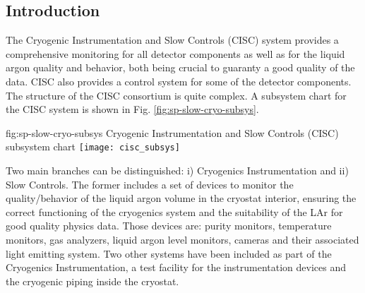 \subsection{Introduction}
\label{sec:fdsp-slow-cryo-intro}



The Cryogenic Instrumentation and Slow Controls (CISC) system provides
a comprehensive monitoring for all detector components as well as for the liquid argon quality and behavior, both being crucial
to guaranty a good quality of the data. CISC also provides a control system for some of the detector components. 
The structure of the CISC consortium is quite complex. A subsystem chart
for the CISC system is shown in Fig. \ref{fig:sp-slow-cryo-subsys}. 

\begin{dunefigure}{fig:sp-slow-cryo-subsys}
{Cryogenic Instrumentation and Slow Controls (CISC) subsystem chart}
\texttt{[image: cisc\_subsys]}
\end{dunefigure}

Two main branches can be distinguished: i) Cryogenics Instrumentation and ii) Slow Controls. The former includes a set of devices 
to monitor the quality/behavior of the liquid argon volume in the cryostat interior, ensuring the correct functioning of
the cryogenics system and the suitability of the LAr for good quality physics data. Those devices are:
purity monitors, temperature monitors, gas analyzers, liquid argon level monitors, cameras and their associated
light emitting system. Two other systems have been included as part of the Cryogenics Instrumentation,  
a test facility for the instrumentation devices and the cryogenic piping inside the cryostat.

